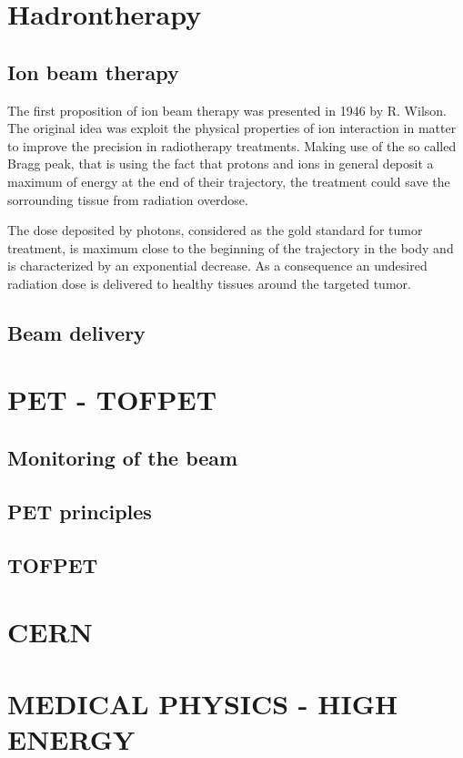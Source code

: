 \section{Hadrontherapy}
\subsection{Ion beam therapy}

The first proposition of ion beam therapy was presented in 1946 by R. Wilson. The original idea was exploit the physical properties of ion interaction in matter to improve the precision in radiotherapy treatments.  
Making use of the so called Bragg peak, that is using the fact that protons and ions in general deposit a maximum of energy at the end of their trajectory, the treatment could save the sorrounding tissue from radiation overdose.

The dose deposited by photons, considered as the gold standard for tumor treatment, is maximum close to the beginning of the trajectory in the body and is characterized by an exponential decrease. As a consequence an undesired radiation dose is delivered to healthy tissues around the targeted tumor.


\subsection{Beam delivery}

\section{PET - TOFPET}
\subsection{Monitoring of the beam}
\subsection{PET principles}
\subsection{TOFPET}



\section{CERN}
\section{MEDICAL PHYSICS - HIGH ENERGY}


